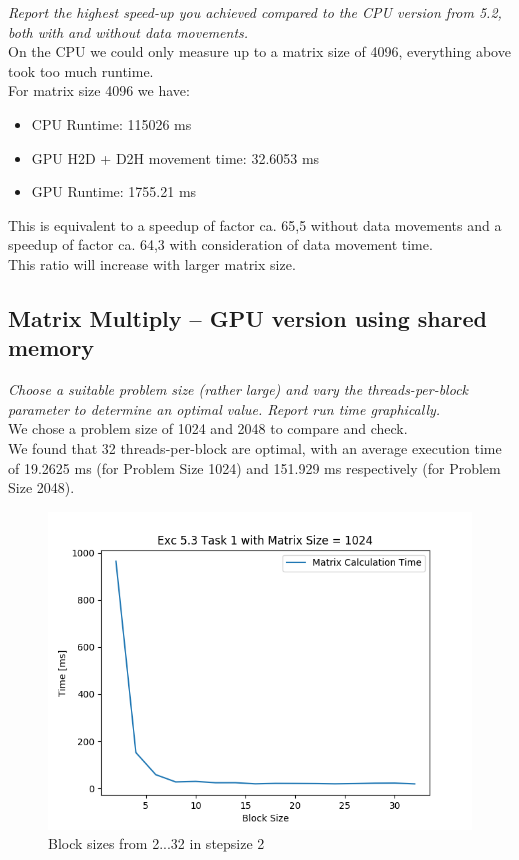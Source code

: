 \documentclass[12pt]{article}
\begin{document}
\noindent\emph{Report the highest speed-up you achieved compared to the CPU version from 5.2, both with and without data movements.}\\
On the CPU we could only measure up to a matrix size of 4096, everything above took too much runtime.\\
For matrix size 4096 we have:
\begin{itemize}
	\item CPU Runtime: 115026 ms
	\item GPU H2D + D2H movement time: 32.6053 ms
	\item GPU Runtime: 1755.21 ms
\end{itemize}
This is equivalent to a speedup of factor ca. 65,5 without data movements and a speedup of factor ca. 64,3 with consideration of data movement time.\\
This ratio will increase with larger matrix size.


\newpage
\subsection{Matrix Multiply – GPU version using shared memory}
\emph{Choose a suitable problem size (rather large) and vary the threads-per-block parameter to determine an optimal value. Report run time graphically.}\\
We chose a problem size of 1024 and 2048 to compare and check.\\
We found that 32 threads-per-block are optimal, with an average execution time of 19.2625 ms (for Problem Size 1024) and 151.929 ms respectively (for Problem Size 2048).\\

\begin{figure}[!htb]
	\caption{Block sizes from 2...32 in stepsize 2}
	\includegraphics[scale=0.68]{5_3_01_1024}
	\centering
\end{figure}
\end{document}
